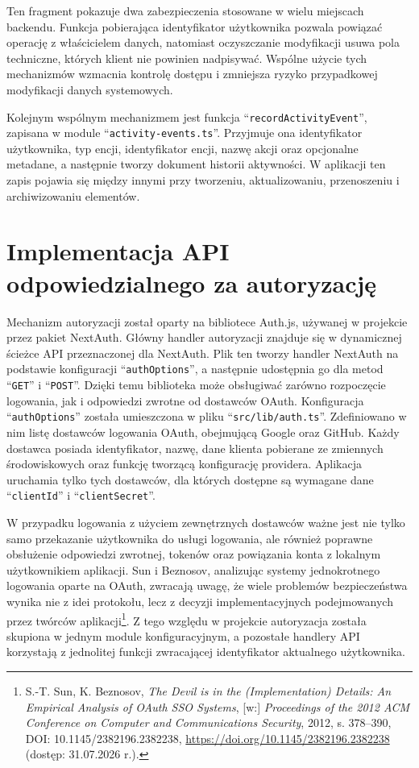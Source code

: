 \documentclass[12pt,a4paper,twoside]{report}
\newcommand{\FirstParagraph}{\noindent\ignorespaces}
\begin{document}
Ten fragment pokazuje dwa zabezpieczenia stosowane w wielu miejscach backendu. Funkcja pobierająca identyfikator użytkownika pozwala powiązać operację z właścicielem danych, natomiast oczyszczanie modyfikacji usuwa pola techniczne, których klient nie powinien nadpisywać. Wspólne użycie tych mechanizmów wzmacnia kontrolę dostępu i zmniejsza ryzyko przypadkowej modyfikacji danych systemowych.

Kolejnym wspólnym mechanizmem jest funkcja ``\texttt{recordActivityEvent}'', zapisana w module ``\texttt{activity-events.ts}''. Przyjmuje ona identyfikator użytkownika, typ encji, identyfikator encji, nazwę akcji oraz opcjonalne metadane, a następnie tworzy dokument historii aktywności. W aplikacji ten zapis pojawia się między innymi przy tworzeniu, aktualizowaniu, przenoszeniu i archiwizowaniu elementów.

\section{Implementacja API odpowiedzialnego za autoryzację}

\FirstParagraph Mechanizm autoryzacji został oparty na bibliotece Auth.js, używanej w projekcie przez pakiet NextAuth. Główny handler autoryzacji znajduje się w dynamicznej ścieżce API przeznaczonej dla NextAuth. Plik ten tworzy handler NextAuth na podstawie konfiguracji ``\texttt{authOptions}'', a następnie udostępnia go dla metod ``\texttt{GET}'' i ``\texttt{POST}''. Dzięki temu biblioteka może obsługiwać zarówno rozpoczęcie logowania, jak i odpowiedzi zwrotne od dostawców OAuth. Konfiguracja ``\texttt{authOptions}'' została umieszczona w pliku ``\texttt{src/lib/auth.ts}''. Zdefiniowano w nim listę dostawców logowania OAuth, obejmującą Google oraz GitHub. Każdy dostawca posiada identyfikator, nazwę, dane klienta pobierane ze zmiennych środowiskowych oraz funkcję tworzącą konfigurację providera. Aplikacja uruchamia tylko tych dostawców, dla których dostępne są wymagane dane ``\texttt{clientId}'' i ``\texttt{clientSecret}''.

W przypadku logowania z użyciem zewnętrznych dostawców ważne jest nie tylko samo przekazanie użytkownika do usługi logowania, ale również poprawne obsłużenie odpowiedzi zwrotnej, tokenów oraz powiązania konta z lokalnym użytkownikiem aplikacji. Sun i Beznosov, analizując systemy jednokrotnego logowania oparte na OAuth, zwracają uwagę, że wiele problemów bezpieczeństwa wynika nie z idei protokołu, lecz z decyzji implementacyjnych podejmowanych przez twórców aplikacji\footnote{S.-T. Sun, K. Beznosov, \emph{The Devil is in the (Implementation) Details: An Empirical Analysis of OAuth SSO Systems}, [w:] \emph{Proceedings of the 2012 ACM Conference on Computer and Communications Security}, 2012, s. 378--390, DOI: 10.1145/2382196.2382238, \url{https://doi.org/10.1145/2382196.2382238} (dostęp: 31.07.2026 r.).}. Z tego względu w projekcie autoryzacja została skupiona w jednym module konfiguracyjnym, a pozostałe handlery API korzystają z jednolitej funkcji zwracającej identyfikator aktualnego użytkownika.
\end{document}
